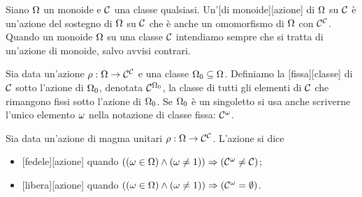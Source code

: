 \begin{Definition}
	Siano $\Omega$ un monoide e $\mathcal{C}$ una classe qualsiasi. Un'[di monoide][azione] di $\Omega$ su $\mathcal{C}$ \`e un'azione del sostegno di $\Omega$ su $\mathcal{C}$ che \`e anche un omomorfismo di $\Omega$ con $\mathcal{C}^{\mathcal{C}}$. Quando un monoide $\Omega$  su una classe $\mathcal{C}$ intendiamo sempre che si tratta di un'azione di monoide, salvo avvisi contrari.
\end{Definition}
\begin{Definition}
	Sia data un'azione $\rho: \Omega \rightarrow \mathcal{C}^{\mathcal{C}}$ e una classe $\Omega_0 \subseteq \Omega$. Definiamo la [fissa][classe] di $\mathcal{C}$ sotto l'azione di $\Omega_0$, denotata $\mathcal{C}^{\Omega_0}$, la classe di tutti gli elementi di $\mathcal{C}$ che rimangono fissi sotto l'azione di $\Omega_0$. Se $\Omega_0$ \`e un singoletto si usa anche scriverne l'unico elemento $\omega$ nella notazione di classe fissa: $\mathcal{C}^{\omega}$.
\end{Definition}
\begin{Definition}
	Sia data un'azione di magma unitari
	$\rho: \Omega \rightarrow \mathcal{C}^{\mathcal{C}}$.
	L'azione si dice
	\begin{itemize}
		\item
		[fedele][azione]
		quando
		$\left ( \left ( \omega \in \Omega \right ) \wedge \left ( \omega \neq 1 \right ) \right ) \Rightarrow \left ( \mathcal{C}^{\omega} \neq \mathcal{C} \right )$;
		\item
		[libera][azione]
		quando
		$\left ( \left ( \omega \in \Omega \right ) \wedge \left ( \omega \neq 1 \right ) \right ) \Rightarrow \left ( \mathcal{C}^{\omega} = \emptyset \right )$.
	\end{itemize}
\end{Definition}
